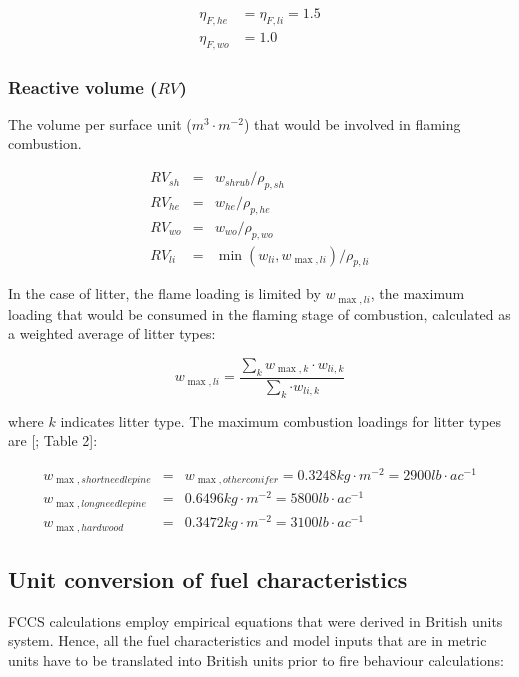 \documentclass[]{book}
\begin{document}
\begin{eqnarray}
\eta_{F, he} &= \eta_{F, li} = 1.5 \\
\eta_{F, wo} &= 1.0
\end{eqnarray}

\subsubsection{\texorpdfstring{Reactive volume
(\(RV\))}{Reactive volume (RV)}}\label{reactive-volume-rv}

The volume per surface unit (\(m^3\cdot m^{-2}\)) that would be involved
in flaming combustion.

\begin{eqnarray}
RV_{sh} &=& w_{shrub}/\rho_{p, sh}\\
RV_{he} &=& w_{he}/\rho_{p, he}\\
RV_{wo} &=& w_{wo}/\rho_{p, wo}\\
RV_{li} &=& \min(w_{li}, w_{\max,li})/\rho_{p, li}
\end{eqnarray}

In the case of litter, the flame loading is limited by \(w_{\max,li}\),
the maximum loading that would be consumed in the flaming stage of
combustion, calculated as a weighted average of litter types:

\begin{equation}
 w_{\max,li} = \frac{\sum_{k}{ w_{\max,k}\cdot w_{li,k}}}{\sum_{k} {\cdot w_{li,k}}}
\end{equation}

where \(k\) indicates litter type. The maximum combustion loadings for
litter types are {[}\citet{Prichard2013}; Table 2{]}:

\begin{eqnarray}
w_{\max,shortneedlepine} &=& w_{\max,otherconifer} = 0.3248 kg \cdot m^{-2} = 2900 lb\cdot ac^{-1} \\
w_{\max,longneedlepine} &=& 0.6496 kg \cdot m^{-2}= 5800 lb\cdot ac^{-1} \\
w_{\max,hardwood} &=& 0.3472 kg \cdot m^{-2}= 3100 lb\cdot ac^{-1} 
\end{eqnarray}

\subsection{Unit conversion of fuel
characteristics}\label{unit-conversion-of-fuel-characteristics}

FCCS calculations employ empirical equations that were derived in
British units system. Hence, all the fuel characteristics and model
inputs that are in metric units have to be translated into British units
prior to fire behaviour calculations:
\end{document}
